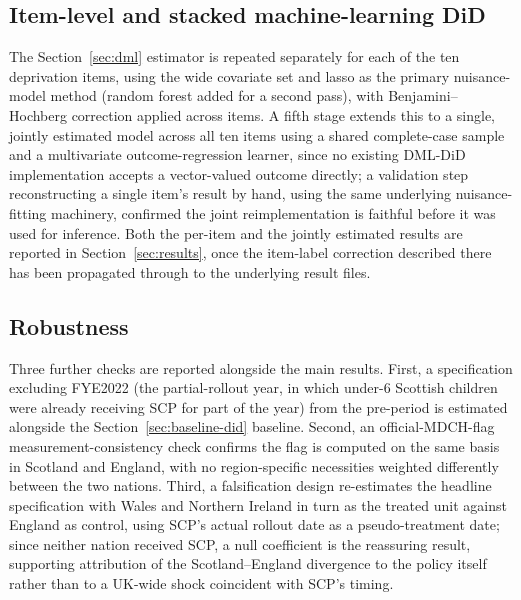 

\subsection{Item-level and stacked machine-learning DiD}
\label{sec:item-dml}

The Section~\ref{sec:dml} estimator is repeated separately for each of the ten deprivation items, using the wide covariate set and lasso as the primary nuisance-model method (random forest added for a second pass), with Benjamini--Hochberg correction applied across items. A fifth stage extends this to a single, jointly estimated model across all ten items using a shared complete-case sample and a multivariate outcome-regression learner, since no existing DML-DiD implementation accepts a vector-valued outcome directly; a validation step reconstructing a single item's result by hand, using the same underlying nuisance-fitting machinery, confirmed the joint reimplementation is faithful before it was used for inference. Both the per-item and the jointly estimated results are reported in Section~\ref{sec:results}, once the item-label correction described there has been propagated through to the underlying result files.

\subsection{Robustness}
\label{sec:robustness}

Three further checks are reported alongside the main results. First, a specification excluding FYE2022 (the partial-rollout year, in which under-6 Scottish children were already receiving SCP for part of the year) from the pre-period is estimated alongside the Section~\ref{sec:baseline-did} baseline. Second, an official-MDCH-flag measurement-consistency check confirms the flag is computed on the same basis in Scotland and England, with no region-specific necessities weighted differently between the two nations. Third, a falsification design re-estimates the headline specification with Wales and Northern Ireland in turn as the treated unit against England as control, using SCP's actual rollout date as a pseudo-treatment date; since neither nation received SCP, a null coefficient is the reassuring result, supporting attribution of the Scotland--England divergence to the policy itself rather than to a UK-wide shock coincident with SCP's timing.
